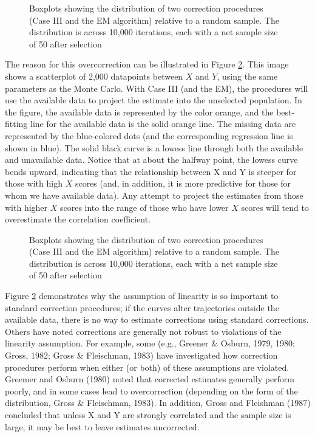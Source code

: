 \documentclass[doc, babel,english]{apa}%
\begin{document}
\begin{figure}[htbp]
\begin{center}
\caption{Boxplots showing the distribution of two correction procedures (Case III and the EM algorithm) relative to a random sample. The distribution is across 10,000 iterations, each with a net sample size of 50 after selection}
\label{fig:demo}
\end{center}
\end{figure}

The reason for this overcorrection can be illustrated in Figure \ref{fig:explanation}. This image shows a scatterplot of 2,000 datapoints between $X$ and $Y$, using the same parameters as the Monte Carlo. With Case III (and the EM), the procedures will use the available data to project the estimate into the unselected population. In the figure, the available data is represented by the color orange, and the best-fitting line for the available data is the solid orange line. The missing data are represented by the blue-colored dots (and the corresponding regression line is shown in blue). The solid black curve is a lowess line through both the available and unavailable data. Notice that at about the halfway point, the lowess curve bends upward, indicating that the relationship between X and Y is steeper for those with high $X$ scores (and, in addition, it is more predictive for those for whom we have available data). Any attempt to project the estimates from those with higher $X$ scores into the range of those who have lower $X$ scores will tend to overestimate the correlation coefficient. 

\begin{figure}[htbp]
\begin{center}
\caption{Boxplots showing the distribution of two correction procedures (Case III and the EM algorithm) relative to a random sample. The distribution is across 10,000 iterations, each with a net sample size of 50 after selection}
\label{fig:explanation}
\end{center}
\end{figure}

Figure \ref{fig:explanation} demonstrates why the assumption of linearity is so important to standard correction procedures; if the curves alter trajectories outside the available data, there is no way to estimate corrections using standard corrections. Others have noted corrections are generally not robust to violations of the linearity assumption. For example, some (e.g., Greener \& Osburn, 1979, 1980; Gross, 1982; Gross \& Fleischman, 1983) have investigated how correction procedures perform when either (or both) of these assumptions are violated. Greemer and Osburn (1980) noted that corrected estimates generally perform poorly, and in some cases lead to overcorrection (depending on the form of the distribution, Gross \& Fleischman, 1983). In addition, Gross and Fleishman (1987) concluded that unless X and Y are strongly correlated and the sample size is large, it may be best to leave estimates uncorrected. 
\end{document}
